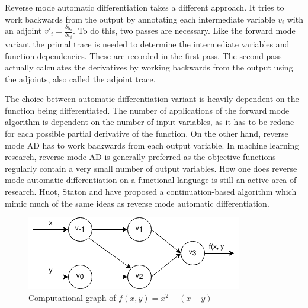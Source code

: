\documentclass[11pt, final]{article}
\begin{document}
Reverse mode automatic differentiation takes a different approach. It tries to work backwards from the output by annotating each intermediate variable $v_i$ with an adjoint $v'_i=\frac{\delta y_i}{\delta v_i}$. To do this, two passes are necessary. Like the forward mode variant the primal trace is needed to determine the intermediate variables and function dependencies. These are recorded in the first pass. The second pass actually calculates the derivatives by working backwards from the output using the adjoints, also called the adjoint trace.

The choice between automatic differentiation variant is heavily dependent on the function being differentiated. The number of applications of the forward mode algorithm is dependent on the number of input variables, as it has to be redone for each possible partial derivative of the function. On the other hand, reverse mode AD has to work backwards from each output variable. In machine learning research, reverse mode AD is generally preferred as the objective functions regularly contain a very small number of output variables. How one does reverse mode automatic differentiation on a functional language is still an active area of research. Huot, Staton and \Vakar{} have proposed a continuation-based algorithm which mimic much of the same ideas as reverse mode automatic differentiation\cite{huot2020correctness}.

\begin{figure}
  \centering
  \includegraphics[scale=0.6]{./assets/function_trace.png}
  \caption{Computational graph of $f(x, y) = x^2 + (x - y)$}
  \label{fig:func_trace}
\end{figure}
\end{document}

